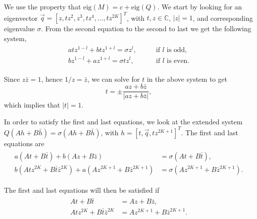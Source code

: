 We use the property that $\text{eig}(M) = c + \text{eig}(Q)$. We start by looking for an eigenvector $\vec{q} = [z,tz^2,z^3,tz^4,\hdots,tz^{2K}]^T$, with $t,z\in\mathbb{C}$, $|z|=1$, and corresponding eigenvalue $\sigma$. From the second equation to the second to last we get the following system,
% 
\begin{equation}
\label{eqn:eigen_Q}
\begin{split}
\begin{aligned}
  atz^{1-l}+btz^{1+l}=\sigma z^l,&\qquad \text{if  }l \text{  is odd},\\
  bz^{1-l}+az^{1+l}=\sigma tz^l,&\qquad \text{if  }l \text{  is even.}
\end{aligned}
\end{split}
\end{equation}
% 

Since $z\bar{z}=1$, hence $1/z = \bar{z}$, we can solve for $t$ in the above system to get
% 
\[
  t=\pm\frac{az+b\bar{z}}{|az+b\bar{z}|},
\]
% 
which implies that $|t|=1$.

In order to satisfy the first and last equations, we look at the extended system $Q(Ah+B\bar{h}) = \sigma (Ah+B\bar{h})$, with $h = [t,\vec{q},tz^{2K+1}]^T$. The first and last equations are
% 
\begin{equation*}
\begin{split}
\begin{aligned}
  a(At+B\bar{t}) + b(Az+B\bar{z}) &= \sigma(At+B\bar{t}),\\
  b(Atz^{2K}+B\bar{t}\bar{z}^{2K}) + a(Az^{2K+1}+B\bar{z}^{2K+1}) &= \sigma(Az^{2K+1}+B\bar{z}^{2K+1}).
\end{aligned}
\end{split}
\end{equation*}
% 

The first and last equations will then be satisfied if
% 
\begin{equation*}
\begin{split}
\begin{aligned}
  At+B\bar{t} &= Az+B\bar{z},\\
  Atz^{2K}+B\bar{t}\bar{z}^{2K} &= Az^{2K+1}+B\bar{z}^{2K+1}.
\end{aligned}
\end{split}
\end{equation*}
% 


